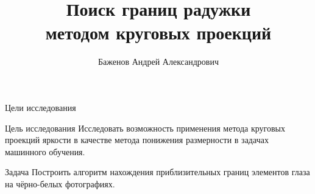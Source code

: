 \documentclass{beamer}
\title{Поиск границ радужки\\ методом круговых проекций}
\author[А.\,А. Баженов]{Баженов Андрей Александрович}
\institute{Московский физико-технический институт}
\date{\footnotesize
\par\smallskip\emph{Курс:} Автоматизация научных исследований\par (практика, В.\,В.~Стрижов)/Группа 821
\par\smallskip\emph{Эксперт:} И.\,А.~Матвеев
\par\smallskip\emph{Консультант:} И.\,А.~Матвеев
\par\bigskip\small 2021}
\begin{document}
\begin{frame}
\thispagestyle{empty}
\maketitle
\end{frame}

\begin{frame}{Цели исследования}
\begin{block}{Цель исследования}
Исследовать возможность применения метода круговых проекций яркости в качестве метода понижения размерности в задачах машинного обучения.
\end{block}
\begin{block}{Задача}
Построить алгоритм нахождения приблизительных границ элементов глаза на чёрно-белых фотографиях. 
\end{block}
\end{frame}
\end{document}
